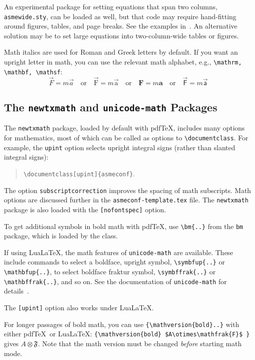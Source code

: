 \documentclass[colorlinks,upint,subscriptcorrection,varvw,hyphenate,balance,greek,russian,vietnamese,german]{asmeconf} %
\newcommand*\pdfTeX{pdf\TeX}
\newcommand*\LuaLaTeX{Lua\LaTeX}
\begin{document}
An experimental package for setting equations that span two columns, \texttt{asmewide.sty}, can be loaded as well, but that code may require hand-fitting around figures, tables, and page breaks. See the examples in~\cite{lienhard2022}. An alternative solution may be to set large equations into two-column-wide tables or figures. 

Math italics are used for Roman and Greek letters by default.  If you want an upright letter in math, you can use the relevant math alphabet, e.g., \verb|\mathrm, \mathbf, \mathsf|:
\begin{equation}\label{eqn:dw}
\vec{F} = m \vec{a} \quad\textrm{or}\quad \vec{\mathrm{F}} = m \vec{\mathrm{a}} \quad\textrm{or}\quad \mathbf{F} = m \mathbf{a} \quad\textrm{or}\quad \vec{\mathsf{F}} = m \vec{\mathsf{a}}
\end{equation}

\subsection{The \texttt{newtxmath} and \texttt{unicode-math} Packages~\cite{sharpe1,robertson2023}} The \texttt{newtxmath} package, loaded by default with \pdfTeX, includes many options for mathematics, most of which can be called as options to \verb|\documentclass|. For example, the \texttt{upint} option selects upright integral signs (rather than slanted integral signs):
\begin{quote}
\verb|\documentclass[upint]{asmeconf}|. 
\end{quote}  
The option \verb|subscriptcorrection| improves the spacing of math subscripts. Math options are discussed further in the \texttt{asmeconf-template.tex} file.  The \texttt{newtxmath} package is also loaded with the \texttt{[nofontspec]} option.

To get additional symbols in bold math with \pdfTeX, use \verb|\bm{..}| from the \texttt{bm} package, which is loaded by the class. 

If using \LuaLaTeX, the math features of \texttt{unicode-math} are available.  These include commands to select a boldface, upright symbol, \verb|\symbfup{..}| or \verb|\mathbfup{..}|, to select boldface fraktur 
symbol, \verb|\symbffrak{..}| or \verb|\mathbffrak{..}|, and so on.  See the documentation of \texttt{unicode-math} for details~\cite{robertson2023}.

The \texttt{[upint]} option also works under \LuaLaTeX.

For longer passages of bold math, you can use \verb|{\mathversion{bold}..}| with either \pdfTeX\  or \LuaLaTeX: 
\verb|{\mathversion{bold} $A\otimes\mathfrak{F}$ }| gives { $A\otimes\mathfrak{F}$}. Note that the math version must be changed \emph{before} starting math mode.
\end{document}

